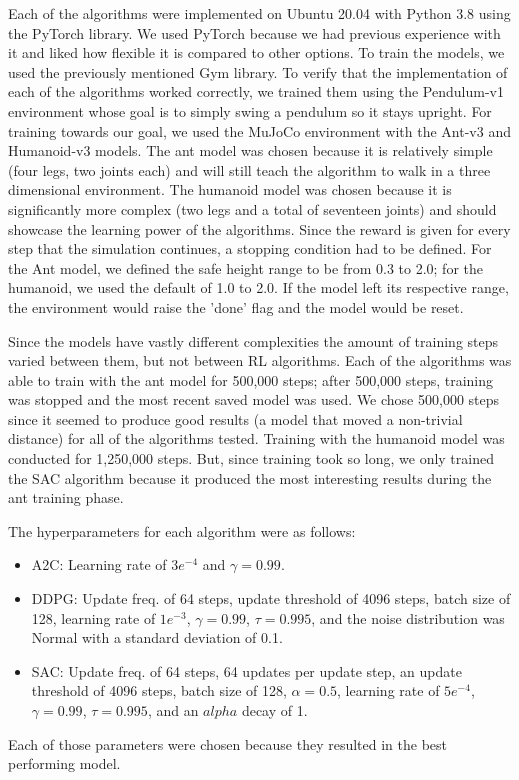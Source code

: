 \documentclass[conference]{IEEEtran}
\begin{document}
Each of the algorithms were implemented on Ubuntu 20.04 with Python 3.8 using the PyTorch library. We used PyTorch
because we had previous experience with it and liked how flexible it is compared to other options. To train the models,
we used the previously mentioned Gym library. To verify that the implementation of each of the algorithms worked
correctly, we trained them using the Pendulum-v1 environment whose goal is to simply swing a pendulum so it stays
upright. For training towards our goal, we used the MuJoCo environment with the Ant-v3 and Humanoid-v3 models. The ant
model was chosen because it is relatively simple (four legs, two joints each) and will still teach the algorithm to walk
in a three dimensional environment. The humanoid model was chosen because it is significantly more complex (two legs and
a total of seventeen joints) and should showcase the learning power of the algorithms. Since the reward is given for
every step that the simulation continues, a stopping condition had to be defined. For the Ant model, we defined the safe
height range to be from 0.3 to 2.0; for the humanoid, we used the default of 1.0 to 2.0. If the model left its
respective range, the environment would raise the 'done' flag and the model would be reset.

Since the models have vastly different complexities the amount of training steps varied between them, but not between RL
algorithms. Each of the algorithms was able to train with the ant model for 500,000 steps; after 500,000 steps, training
was stopped and the most recent saved model was used. We chose 500,000 steps since it seemed to produce good results (a
model that moved a non-trivial distance) for all of the algorithms tested. Training with the humanoid model was
conducted for 1,250,000 steps. But, since training took so long, we only trained the SAC algorithm because it produced
the most interesting results during the ant training phase.

The hyperparameters for each algorithm were as follows:
\begin{itemize}
    \item A2C: Learning rate of $3e^{-4}$ and $\gamma = 0.99$.
    \item DDPG: Update freq. of 64 steps, update threshold of 4096 steps, batch size of 128, learning rate of $1e^{-3}$,
    $\gamma = 0.99$, $\tau = 0.995$, and the noise distribution was Normal with a standard deviation of 0.1.
    \item SAC: Update freq. of 64 steps, 64 updates per update step, an update threshold of 4096 steps, batch size of
    128, $\alpha = 0.5$, learning rate of $5e^{-4}$, $\gamma = 0.99$, $\tau = 0.995$, and an $alpha$ decay of 1.
\end{itemize}
Each of those parameters were chosen because they resulted in the best performing model.
\end{document}
